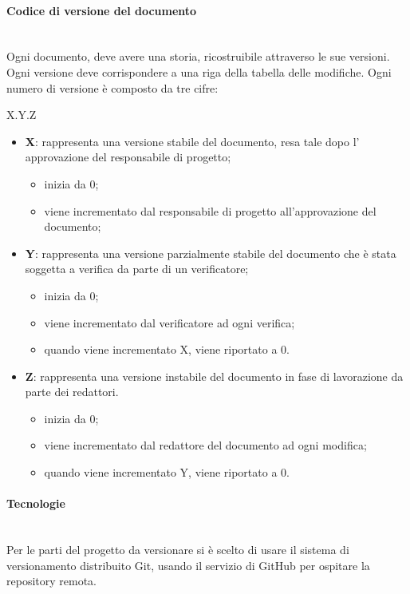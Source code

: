 	\paragraph{Codice di versione del documento} \mbox{}\\
	Ogni documento, deve avere una storia, ricostruibile attraverso le sue versioni. Ogni versione deve corrispondere a una riga della tabella delle modifiche. Ogni numero di versione è composto da tre cifre:
	\begin{center}
		X.Y.Z
	\end{center}
	\begin{itemize}
		\item \textbf{X}: rappresenta una versione stabile del documento, resa tale dopo l' approvazione del responsabile di progetto;
		\begin{itemize}
			\item inizia da 0;
			\item viene incrementato dal responsabile di progetto all'approvazione del documento;
		\end{itemize}
		\item \textbf{Y}: rappresenta una versione parzialmente stabile del documento che è stata soggetta a verifica da parte di un verificatore;
		\begin{itemize}
			\item inizia da 0;
			\item viene incrementato dal verificatore ad ogni verifica;
			\item quando viene incrementato X, viene riportato a 0.
		\end{itemize}
		\item \textbf{Z}: rappresenta una versione instabile del documento in fase di lavorazione da parte dei redattori.
		\begin{itemize}
			\item inizia da 0;
			\item viene incrementato dal redattore del documento ad ogni modifica;
			\item quando viene incrementato Y, viene riportato a 0.
		\end{itemize}			
	\end{itemize}
	\paragraph{Tecnologie} \mbox{}\\
	Per le parti del progetto da versionare si è scelto di usare il sistema di versionamento distribuito Git, usando il servizio di GitHub per ospitare la repository remota.
